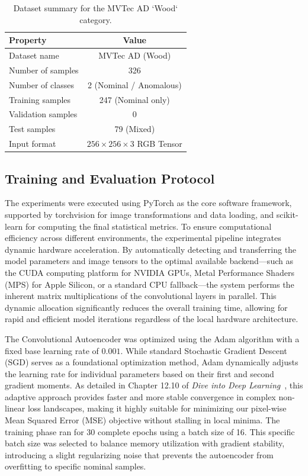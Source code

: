 \documentclass[10pt,twocolumn,a4paper]{article}
\begin{document}
\begin{table}[h]
    \centering
    \caption{Dataset summary for the MVTec AD `Wood` category.}
    \label{tab:dataset}
    \begin{tabular}{lc}
        \toprule
        \textbf{Property} & \textbf{Value} \\
        \midrule
        Dataset name & MVTec AD (Wood) \\
        Number of samples & 326 \\
        Number of classes & 2 (Nominal / Anomalous) \\
        Training samples & 247 (Nominal only) \\
        Validation samples & 0 \\
        Test samples & 79 (Mixed) \\
        Input format & $256 \times 256 \times 3$ RGB Tensor \\
        \bottomrule
    \end{tabular}
\end{table}


 
	

\subsection{Training and Evaluation Protocol}

The experiments were executed using PyTorch as the core software framework, supported by torchvision for image transformations and data loading, and scikit-learn for computing the final statistical metrics. To ensure computational efficiency across different environments, the experimental pipeline integrates dynamic hardware acceleration. By automatically detecting and transferring the model parameters and image tensors to the optimal available backend—such as the CUDA computing platform for NVIDIA GPUs, Metal Performance Shaders (MPS) for Apple Silicon, or a standard CPU fallback—the system performs the inherent matrix multiplications of the convolutional layers in parallel. This dynamic allocation significantly reduces the overall training time, allowing for rapid and efficient model iterations regardless of the local hardware architecture.

The Convolutional Autoencoder was optimized using the Adam algorithm with a fixed base learning rate of $0.001$. While standard Stochastic Gradient Descent (SGD) serves as a foundational optimization method, Adam dynamically adjusts the learning rate for individual parameters based on their first and second gradient moments. As detailed in Chapter 12.10 of \textit{Dive into Deep Learning}~\cite{zhang2021dive}, this adaptive approach provides faster and more stable convergence in complex non-linear loss landscapes, making it highly suitable for minimizing our pixel-wise Mean Squared Error (MSE) objective without stalling in local minima. The training phase ran for 30 complete epochs using a batch size of 16. This specific batch size was selected to balance memory utilization with gradient stability, introducing a slight regularizing noise that prevents the autoencoder from overfitting to specific nominal samples.
\end{document}
